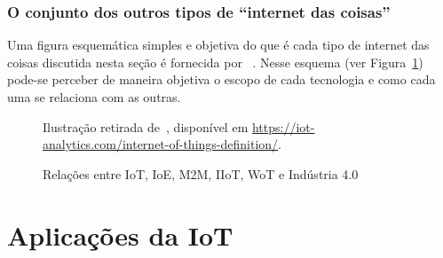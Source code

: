 \documentclass[pdftex, brazil, 12pt, twoside]{article}
\begin{document}
\subsubsection{O conjunto dos outros tipos de ``internet das coisas''}
\label{o-que-e-iot-outros-tipos-conjunto}

Uma figura esquemática simples e objetiva do que é cada tipo de internet das coisas
discutida nesta seção é fornecida por ~\citet{LuethIoT2014}. Nesse esquema
(ver Figura~\ref{fig:outras-iot}) pode-se
perceber de maneira objetiva o escopo de cada tecnologia e como cada uma se relaciona
com as outras.

\begin{figure}[h]
  \begin{center}
    \caption{Relações entre IoT, IoE, M2M, IIoT, WoT e Indústria 4.0}
    \label{fig:outras-iot}
    
    \footnotesize{Ilustração retirada de~\citet{LuethIoT2014},
      disponível em \url{https://iot-analytics.com/internet-of-things-definition/}.}
  \end{center}
\end{figure}


\section{Aplicações da IoT}
\label{aplicacoes-iot}
\end{document}
